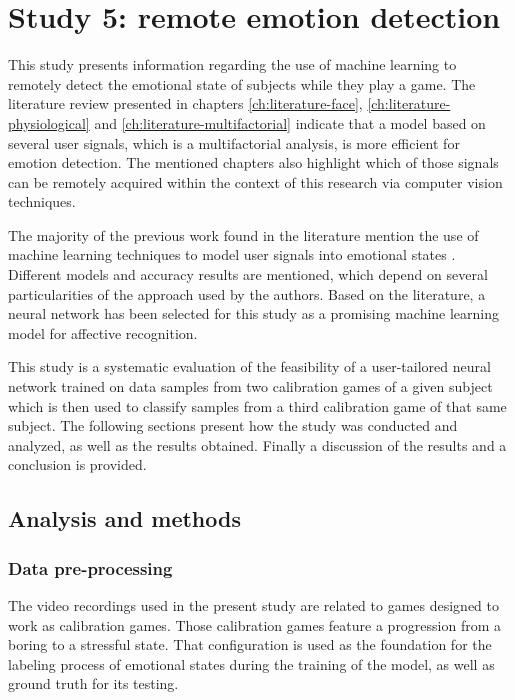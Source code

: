 \section{Study 5: remote emotion detection}
\label{s:experiment1-study5}

This study presents information regarding the use of machine learning to remotely detect the emotional state of subjects while they play a game. The literature review presented in chapters \ref{ch:literature-face}, \ref{ch:literature-physiological} and \ref{ch:literature-multifactorial} indicate that a model based on several user signals, which is a multifactorial analysis, is more efficient for emotion detection. The mentioned chapters also highlight which of those signals can be remotely acquired within the context of this research via computer vision techniques.

The majority of the previous work found in the literature mention the use of machine learning techniques to model user signals into emotional states \parencite{moghimi2017affective}. Different models and accuracy results are mentioned, which depend on several particularities of the approach used by the authors. Based on the literature, a neural network has been selected for this study as a promising machine learning model for affective recognition.

This study is a systematic evaluation of the feasibility of a user-tailored neural network trained on data samples from two calibration games of a given subject which is then used to classify samples from a third calibration game of that same subject. The following sections present how the study was conducted and analyzed, as well as the results obtained. Finally a discussion of the results and a conclusion is provided.

\subsection{Analysis and methods}
\label{s:experiment1-study5-method}

\subsubsection{Data pre-processing}

The video recordings used in the present study are related to games designed to work as calibration games. Those calibration games feature a progression from a boring to a stressful state. That configuration is used as the foundation for the labeling process of emotional states during the training of the model, as well as ground truth for its testing.

